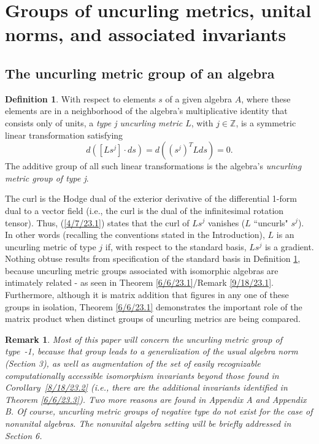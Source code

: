 \documentclass{amsart}
\numberwithin{equation}{section}
\newtheorem{remark}[theorem]{Remark}
\theoremstyle{definition}
\newtheorem{definition}[theorem]{Definition}
\numberwithin{theorem}{section}
\begin{document}
           
       \bigskip
       

 \section{Groups of uncurling metrics, unital norms, and associated  invariants}
 
 
   
   \subsection{The uncurling metric group of an algebra}
     
  \begin{definition}\label{7/21/23.1} With respect to elements $s$ of a given algebra $A$, where these elements are in a neighborhood of the algebra's multiplicative identity that consists only of units, a  {\it type j uncurling metric $L$}, with $j\in \mathbb{Z}$, is a symmetric linear transformation  satisfying \begin{equation}\label{4/7/23.1} d([Ls^j]\cdot ds) = d\left((s^j)^T L ds\right) = 0. \end{equation}  The additive group of all such linear transformations is the algebra's {\it uncurling metric group of type j}.   \end{definition}
  
  \enlargethispage{1cm}
  
 The curl is the Hodge dual of the exterior derivative of the differential \mbox{1-form} dual to a vector field (i.e., the curl is the dual of the infinitesimal rotation tensor).  Thus, (\ref{4/7/23.1}) states that the curl of $Ls^j$ vanishes ($L$ ``uncurls" $s^j$).    In other words (recalling the conventions stated in the Introduction), $L$ is an uncurling metric of type $j$ if, with respect to the standard basis, $Ls^j$ is a gradient.   Nothing obtuse results from specification of the standard basis in Definition \ref{7/21/23.1}, because uncurling metric groups associated with isomorphic algebras are intimately related - as seen in Theorem \ref{6/6/23.1}/Remark \ref{9/18/23.1}.
  Furthermore, although it is matrix addition that figures  \enlargethispage{.6cm} in any one of these groups in isolation, Theorem \ref{6/6/23.1} demonstrates the important role of the matrix product when distinct groups of uncurling metrics are being compared.  
   
\begin{remark}\label{10/16/23.1} {\rm  Most of this paper will concern the uncurling metric group of \mbox{type -1}, because that group leads to a generalization of the usual algebra norm (Section 3), as well as augmentation of the set of easily recognizable computationally accessible isomorphism invariants beyond those found in \mbox{Corollary \ref{8/18/23.2}} (i.e., there are the additional invariants identified in Theorem \ref{6/6/23.3}). Two more reasons are found in Appendix A and Appendix B. Of course, uncurling metric groups of negative type do not exist for the case of nonunital algebras.  The nonunital algebra setting will be briefly addressed in Section 6.  } \end{remark}
 
\end{document}
